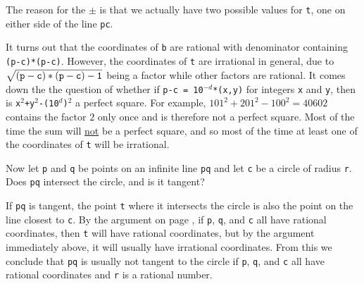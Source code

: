 \documentclass[12pt]{article}
\begin{document}
The reason for the $\pm$ is that we actually have two possible
values for {\tt t}, one on either side of the line {\tt pc}.

It turns out that the coordinates of {\tt b} are rational
with denominator containing {\tt (p-c)*(p-c)}.  However, the
coordinates of {\tt t} are irrational in general, due to
$\sqrt{\tt (p-c)*(p-c) - 1}$ being a factor while other factors are rational.
It comes down the the question of whether if {\tt p-c = 10$^{-d}$*(x,y)}
for integers {\tt x} and {\tt y}, then is
{\tt x$^2$+y$^2$-(10$^d$)$^2$} a perfect square.
For example, $101^2+201^2-100^2= 40602$ contains the factor $2$ only once
and is therefore not a perfect square.
Most of the time the sum will \underline{not}
be a perfect square, and so most of the time at least one of the
coordinates of {\tt t} will be irrational.

Now let {\tt p} and {\tt q} be points on an infinite line {\tt pq}
and let {\tt c} be a circle of radius {\tt r}.  Does {\tt pq} intersect
the circle, and is it tangent?

If {\tt pq} is tangent, the point {\tt t} where it intersects the
circle is also the point on the line closest to {\tt c}.  By
the argument on page \pageref{CLOSEST-IS-RATIONAL}, if
{\tt p}, {\tt q}, and {\tt c} all have rational coordinates, then
{\tt t} will have rational coordinates, but by the argument immediately
above, it will usually have irrational coordinates.  From this
we conclude that {\tt pq} is usually not tangent to the circle
if {\tt p}, {\tt q}, and {\tt c} all have rational coordinates and
{\tt r} is a rational number.

\bigskip
\end{document}
